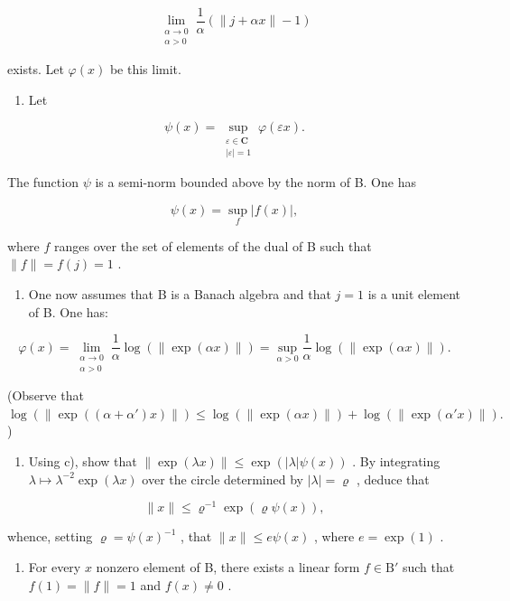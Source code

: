 \[
\lim_{\substack{\alpha \to 0\\ \alpha >0}}\frac{1}{\alpha} (\| j + \alpha x\| -1)
\]

exists. Let \(\varphi(x)\) be this limit.

\begin{enumerate}
\def\labelenumi{\alph{enumi})}
\setcounter{enumi}{1}
\tightlist
\item
  Let
\end{enumerate}

\[
\psi (x) = \sup_{\substack{\varepsilon \in \mathbf{C}\\ |\varepsilon | = 1}}\varphi (\varepsilon x).
\]

The function \(\psi\) is a semi-norm bounded above by the norm of B. One has

\[
\psi (x) = \sup _ {f} | f (x) |,
\]

where \(f\) ranges over the set of elements of the dual of B such that \(\|f\| = f(j) = 1\) .

\begin{enumerate}
\def\labelenumi{\alph{enumi})}
\setcounter{enumi}{2}
\tightlist
\item
  One now assumes that B is a Banach algebra and that \(j = 1\) is a unit element of B. One has:
\end{enumerate}

\[
\varphi (x) = \lim_{\substack{\alpha \to 0\\ \alpha >0}}\frac{1}{\alpha}\log (\| \exp (\alpha x)\|) = \sup_{\alpha >0}\frac{1}{\alpha}\log (\| \exp (\alpha x)\|).
\]

(Observe that \(\log(\|\exp((\alpha+\alpha')x)\|) \leqslant \log(\|\exp(\alpha x)\|) + \log(\|\exp(\alpha' x)\|).\) )

\begin{enumerate}
\def\labelenumi{\alph{enumi})}
\setcounter{enumi}{3}
\tightlist
\item
  Using c), show that \(\|\exp(\lambda x)\| \leqslant \exp(|\lambda|\psi(x))\) . By integrating \(\lambda \mapsto \lambda^{-2} \exp(\lambda x)\) over the circle determined by \(|\lambda| = \varrho\) , deduce that
\end{enumerate}

\[
\| x \| \leqslant \varrho^ {- 1} \exp (\varrho \psi (x)),
\]

whence, setting \(\varrho = \psi(x)^{-1}\) , that \(\|x\| \leqslant e\psi(x)\) , where \(e = \exp(1)\) .

\begin{enumerate}
\def\labelenumi{\alph{enumi})}
\setcounter{enumi}{4}
\tightlist
\item
  For every \(x\) nonzero element of B, there exists a linear form \(f \in \mathrm{B}'\) such that \(f(1) = \| f \| = 1\) and \(f(x) \neq 0\) .
\end{enumerate}

